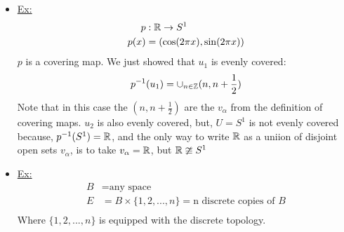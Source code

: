 \documentclass[../notes.tex]{subfiles}
\begin{document}
    \begin{itemize}
        \item \underline{Ex:}
            \begin{align*}
                p&: \mathbb{R} \rightarrow S^1\\
                p(x)&=(\cos(2\pi x), \sin(2\pi x))\\
            \end{align*}
            $p$ is a covering map. We just showed that $u_1$ is evenly covered:
            \begin{align*}
                p^{-1}(u_1)=\cup_{n\in \mathbb{Z}}(n,n+\frac{1}{2})\\
            \end{align*}
            Note that in this case the $(n, n+\frac{1}{2})$ are the $v_\alpha$ from the definition of
            covering maps. $u_2$ is also evenly covered, but, $U=S^{1}$ is not evenly covered because,
            $p^{-1}(S^{1})=\mathbb{R}$, and the only way to write $\mathbb{R}$ as a uniion of disjoint open sets $v_\alpha$,
            is to take $v_\alpha=\mathbb{R}$, but $\mathbb{R} \ncong S^1$
        \item \underline{Ex:}
            \begin{align*}
                B&=\text{any space}\\
                E&=B\times \{1,2,...,n\}=\text{n discrete copies of $B$}\\
            \end{align*}
            Where $\{1,2,...,n\}$ is equipped with the discrete topology.
    \end{itemize}
\end{document}
